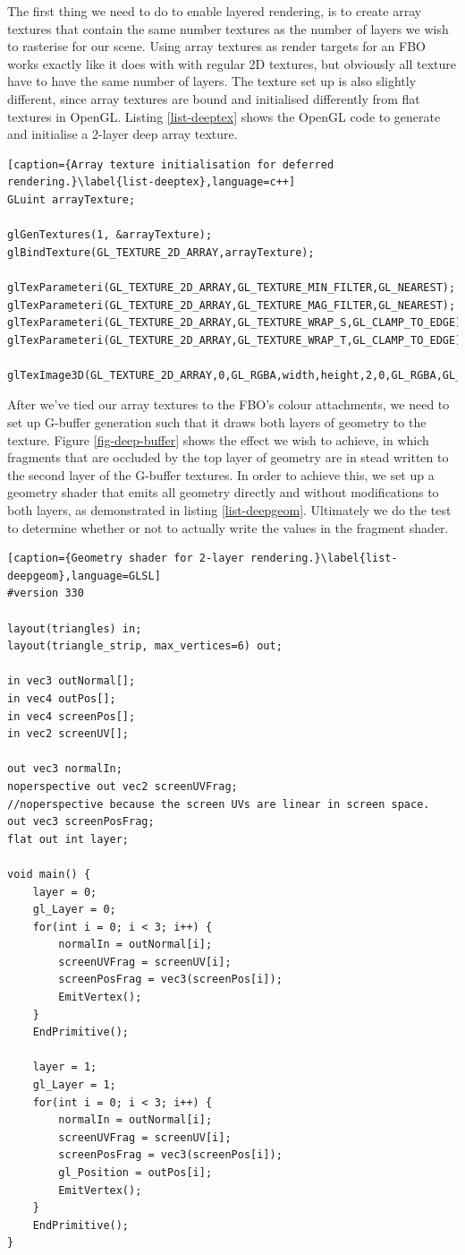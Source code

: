The first thing we need to do to enable layered rendering, is to create array textures that contain the same number textures as the number of layers we wish to rasterise for our scene. Using array textures as render targets for an FBO works exactly like it does with with regular 2D textures, but obviously all texture have to have the same number of layers. The texture set up is also slightly different, since array textures are bound and initialised differently from flat textures in OpenGL. Listing \ref{list-deeptex} shows the OpenGL code to generate and initialise a 2-layer deep array texture.

\begin{lstlisting}[caption={Array texture initialisation for deferred rendering.}\label{list-deeptex},language=c++]
GLuint arrayTexture;

glGenTextures(1, &arrayTexture);
glBindTexture(GL_TEXTURE_2D_ARRAY,arrayTexture);

glTexParameteri(GL_TEXTURE_2D_ARRAY,GL_TEXTURE_MIN_FILTER,GL_NEAREST);
glTexParameteri(GL_TEXTURE_2D_ARRAY,GL_TEXTURE_MAG_FILTER,GL_NEAREST);
glTexParameteri(GL_TEXTURE_2D_ARRAY,GL_TEXTURE_WRAP_S,GL_CLAMP_TO_EDGE);
glTexParameteri(GL_TEXTURE_2D_ARRAY,GL_TEXTURE_WRAP_T,GL_CLAMP_TO_EDGE);

glTexImage3D(GL_TEXTURE_2D_ARRAY,0,GL_RGBA,width,height,2,0,GL_RGBA,GL_UNSIGNED_BYTE,0);
\end{lstlisting}

After we've tied our array textures to the FBO's colour attachments, we need to set up G-buffer generation such that it draws both layers of geometry to the texture. Figure \ref{fig-deep-buffer} shows the effect we wish to achieve, in which fragments that are occluded by the top layer of geometry are in stead written to the second layer of the G-buffer textures. In order to achieve this, we set up a geometry shader that emits all geometry directly and without modifications to both layers, as demonstrated in listing \ref{list-deepgeom}. Ultimately we do the test to determine whether or not to actually write the values in the fragment shader.

\begin{lstlisting}[caption={Geometry shader for 2-layer rendering.}\label{list-deepgeom},language=GLSL]
#version 330

layout(triangles) in;
layout(triangle_strip, max_vertices=6) out;

in vec3 outNormal[];
in vec4 outPos[];
in vec4 screenPos[];
in vec2 screenUV[];

out vec3 normalIn;
noperspective out vec2 screenUVFrag;
//noperspective because the screen UVs are linear in screen space.
out vec3 screenPosFrag;
flat out int layer;

void main() {
	layer = 0;
	gl_Layer = 0;
	for(int i = 0; i < 3; i++) {
		normalIn = outNormal[i];
		screenUVFrag = screenUV[i];
		screenPosFrag = vec3(screenPos[i]);
		EmitVertex();
	}
	EndPrimitive();
	
	layer = 1;
	gl_Layer = 1;
	for(int i = 0; i < 3; i++) {
		normalIn = outNormal[i];
		screenUVFrag = screenUV[i];
		screenPosFrag = vec3(screenPos[i]);
		gl_Position = outPos[i];
		EmitVertex();
	}
	EndPrimitive();
}
\end{lstlisting}

